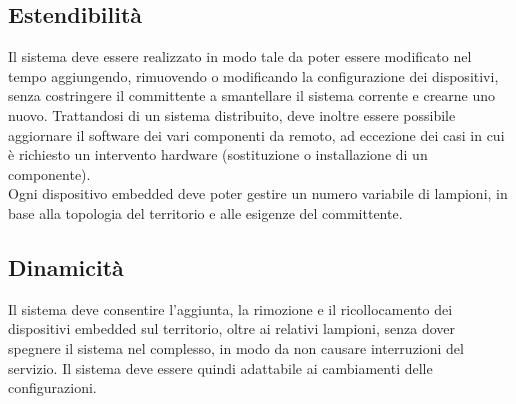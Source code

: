 \subsection{Estendibilità}
Il sistema deve essere realizzato in modo tale da poter essere modificato nel tempo aggiungendo, rimuovendo o modificando la configurazione dei dispositivi, senza costringere il committente a smantellare il sistema corrente e crearne uno nuovo.
Trattandosi di un sistema distribuito, deve inoltre essere possibile aggiornare il software dei vari componenti da remoto, ad eccezione dei casi in cui è richiesto un intervento hardware (sostituzione o installazione di un componente).
\\Ogni dispositivo embedded deve poter gestire un numero variabile di lampioni, in base alla topologia del territorio e alle esigenze del committente.

\subsection{Dinamicità}
Il sistema deve consentire l'aggiunta, la rimozione e il ricollocamento dei dispositivi embedded sul territorio, oltre ai relativi lampioni, senza dover spegnere il sistema nel complesso, in modo da non causare interruzioni del servizio.
Il sistema deve essere quindi adattabile ai cambiamenti delle configurazioni.

